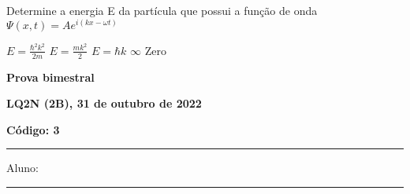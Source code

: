 \documentclass[12pt, addpoints]{exam}
\begin{document}
        \begin{questions}
\begin{multicols*}{2}
\question[20] Determine a energia E da partícula que possui a função de onda $\Psi(x,t)=Ae^{i(kx-\omega t)}$

\begin{choices}
\choice $E=\frac{\hbar^2k^2}{2m}$ \choice $E = \frac{mk^2}{2}$ \choice $E=\hbar k$ \choice $\infty$ \choice Zero \end{choices}
\end{multicols*}
\end{questions}
\newpage
        \begin{minipage}[b]{0.75\linewidth}
            \begin{flushleft}
                {\bf \large Prova bimestral}
            \end{flushleft}
            \begin{flushleft}
                {\bf \large LQ2N (2B), 31 de outubro de 2022}
            \end{flushleft}
        \end{minipage}
        \begin{minipage}[b]{0.20\linewidth}
            \begin{flushright}
                {\bf \large Código: 3}
            \end{flushright}
        \end{minipage}
        \vspace{0.5cm} \hrule \vspace{0.5cm}
        \begin{minipage}{0.75\linewidth}
            Aluno:
        \end{minipage}
        \vspace{0.5cm} \hrule \vspace{0.5cm}
\end{document}
